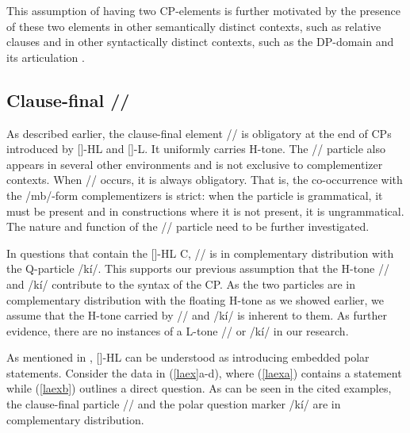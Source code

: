 \documentclass[output=paper,colorlinks,citecolor=brown]{langscibook}
\begin{document}
This assumption of having two CP-elements is further motivated by the presence of these two elements in other semantically distinct contexts, such as relative clauses \citep{Kouankem2011} and in other syntactically distinct contexts, such as the DP-domain and its articulation \citep{Kouankem2011, Kouankem2012}.

\subsection{Clause-final /\la/}

As described earlier, the clause-final element /\la/ is obligatory at the end of CPs introduced by [\mbuHL]-HL and [\nda]-L. It uniformly carries H-tone. The /\la/ particle also appears in several other environments and is not exclusive to complementizer contexts. When /\la/ occurs, it is always obligatory. That is, the co-occurrence with the /mb\baru/-form complementizers is strict: when the particle is grammatical, it must be present and in constructions where it is not present, it is ungrammatical. The nature and function of the /\la/ particle need to be further investigated.

In questions that contain the [\mbuHL]-HL C, /\la/ is in complementary distribution with the Q-particle /k{í}/. This supports our previous assumption that the H-tone /\la/ and /k{í}/ contribute to the syntax of the CP. As the two particles are in complementary distribution with the floating H-tone as we showed earlier, we assume that the H-tone carried by /\la/ and /k{í}/ is inherent to them. As further evidence, there are no instances of a L-tone /\la/ or /k{í}/ in our research.

As mentioned in , [\mbuHL]-HL can be understood as introducing embedded polar statements. Consider the data in (\ref{laex}a-d), where (\ref{laexa}) contains a statement while (\ref{laexb}) outlines a direct question. As can be seen in the cited examples, the clause-final particle /\la/ and the polar question marker /k{í}/ are in complementary distribution.
\end{document}
